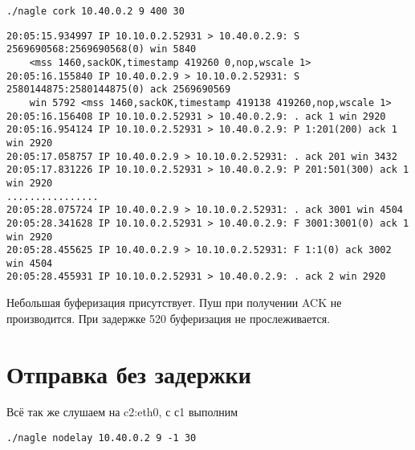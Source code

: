\documentclass[a4paper,12pt]{article}
\begin{document}
\begin{Verbatim}
./nagle cork 10.40.0.2 9 400 30
\end{Verbatim}

\begin{Verbatim}
20:05:15.934997 IP 10.10.0.2.52931 > 10.40.0.2.9: S 2569690568:2569690568(0) win 5840 
	<mss 1460,sackOK,timestamp 419260 0,nop,wscale 1>
20:05:16.155840 IP 10.40.0.2.9 > 10.10.0.2.52931: S 2580144875:2580144875(0) ack 2569690569 
	win 5792 <mss 1460,sackOK,timestamp 419138 419260,nop,wscale 1>
20:05:16.156408 IP 10.10.0.2.52931 > 10.40.0.2.9: . ack 1 win 2920 
20:05:16.954124 IP 10.10.0.2.52931 > 10.40.0.2.9: P 1:201(200) ack 1 win 2920 
20:05:17.058757 IP 10.40.0.2.9 > 10.10.0.2.52931: . ack 201 win 3432 
20:05:17.831226 IP 10.10.0.2.52931 > 10.40.0.2.9: P 201:501(300) ack 1 win 2920 
................
20:05:28.075724 IP 10.40.0.2.9 > 10.10.0.2.52931: . ack 3001 win 4504 
20:05:28.341628 IP 10.10.0.2.52931 > 10.40.0.2.9: F 3001:3001(0) ack 1 win 2920 
20:05:28.455625 IP 10.40.0.2.9 > 10.10.0.2.52931: F 1:1(0) ack 3002 win 4504 
20:05:28.455931 IP 10.10.0.2.52931 > 10.40.0.2.9: . ack 2 win 2920 
\end{Verbatim}
Небольшая буферизация присутствует. Пуш при получении ACK не производится. При задержке 520 буферизация не прослеживается.

\section{Отправка без задержки}

Всё так же слушаем на c2:eth0, с с1 выполним

\begin{Verbatim}
./nagle nodelay 10.40.0.2 9 -1 30
\end{Verbatim}
\end{document}
